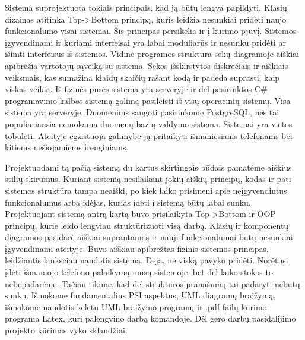 \documentclass[oneside]{VUMIFPSkursinis}
\begin{document}
Sistema suprojektuota tokiais principais, kad ją būtų lengva papildyti. Klasių dizainas atitinka Top->Bottom principą, kuris leidžia nesunkiai pridėti naujo funkcionalumo visai sistemai. Šis principas persikelia ir į kūrimo pjūvį. Sistemos įgyvendinami ir kuriami interfeisai yra labai moduliarūs ir nesunku pridėti ar išimti interfeisus iš sistemos. Vidinė programos struktūra sekų diagramoje aiškiai apibrėžia vartotojų sąveiką su sistema. Sekos išskirstytos diskrečiais ir aiškiais veiksmais, kas sumažina klaidų skaičių rašant kodą ir padeda suprasti, kaip viskas veikia. Iš fizinės pusės sistema yra serveryje ir dėl pasirinktos C\# programavimo kalbos sistemą galimą pasileisti iš visų operacinių sistemų. Visa sistema yra serveryje. Duomenims saugoti pasirinkome PostgreSQL, nes tai populiariausia nemokama duomenų bazių valdymo sistema. Sistemai yra vietos tobulėti. Ateityje egzistuoja galimybė ją pritaikyti išmaniesiams telefonams bei kitiems nešiojamiems įrenginiams.


Projektuodami tą pačią sistemą du kartus skirtingais būdais pamatėme aiškius stilių skirumus. Kuriant sistemą nesilaikant jokių aiškių principų, kodas ir pati sistemos struktūra tampa neaiški, po kiek laiko prisimeni apie neįgyvendintus funkcionalumus arba idėjas, kurias įdėti į sistemą būtų labai sunku. Projektuojant sistemą antrą kartą buvo prisilaikyta Top->Bottom ir OOP principų, kurie leido lengviau struktūrizuoti visą darbą. Klasių ir komponentų diagramos pasidarė aiškiai suprantamos ir nauji funkcionalumai būtų nesunkiai įgyvendinami ateityje. Buvo aiškiau apibrėžtas fizinis sistemos principas, leidžiantis lanksciau naudotis sistema. Deja, ne viską pavyko pridėti. Norėtųsi įdėti išmaniojo telefono palaikymą mūsų sistemoje, bet dėl laiko stokos to nebepadarėme. Tačiau tikime, kad dėl struktūros pranašumų tai padaryti nebūtų sunku. Išmokome fundamentalius PSI aspektus, UML diagramų braižymą, išmokome naudotis keletu UML braižymo programų ir .pdf failų kurimo programa Latex, kuri palengvino darbą komandoje. Dėl gero darbų pasidalijimo projekto kūrimas vyko sklandžiai. 
\end{document}
